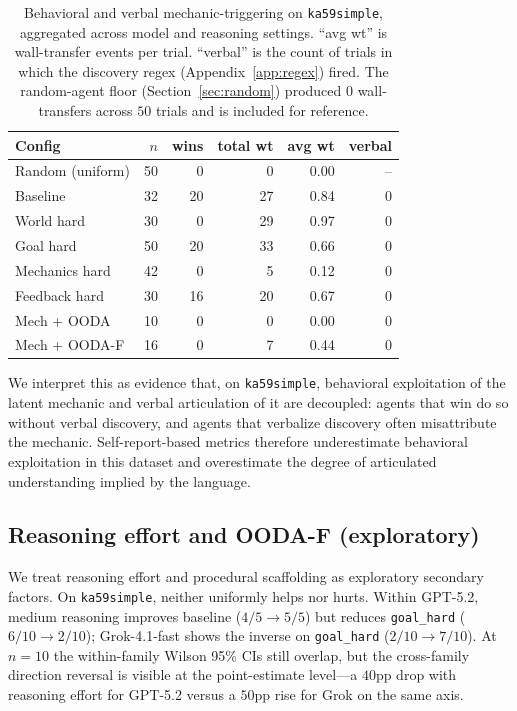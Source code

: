\documentclass{article}
\begin{document}
\begin{table}[t]
  \small
  \setlength{\tabcolsep}{4pt}
  \caption{Behavioral and verbal mechanic-triggering on \texttt{ka59simple}, aggregated across model and reasoning settings. ``avg wt'' is wall-transfer events per trial. ``verbal'' is the count of trials in which the discovery regex (Appendix~\ref{app:regex}) fired. The random-agent floor (Section~\ref{sec:random}) produced $0$ wall-transfers across $50$ trials and is included for reference.}
  \label{tab:mechanic-triggering}
  \centering
  \begin{tabular}{lrrrrr}
    \toprule
    Config & $n$ & wins & total wt & avg wt & verbal \\
    \midrule
    Random (uniform)         & 50 &  0 &  0 & 0.00 & --  \\
    Baseline                 & 32 & 20 & 27 & 0.84 &  0  \\
    World hard               & 30 &  0 & 29 & 0.97 &  0  \\
    Goal hard                & 50 & 20 & 33 & 0.66 &  0  \\
    Mechanics hard           & 42 &  0 &  5 & 0.12 &  0  \\
    Feedback hard            & 30 & 16 & 20 & 0.67 &  0  \\
    Mech + OODA              & 10 &  0 &  0 & 0.00 &  0  \\
    Mech + OODA-F            & 16 &  0 &  7 & 0.44 &  0  \\
    \bottomrule
  \end{tabular}
\end{table}

We interpret this as evidence that, on \texttt{ka59simple}, behavioral exploitation of the latent mechanic and verbal articulation of it are decoupled: agents that win do so without verbal discovery, and agents that verbalize discovery often misattribute the mechanic. Self-report-based metrics therefore underestimate behavioral exploitation in this dataset and overestimate the degree of articulated understanding implied by the language.

\subsection{Reasoning effort and OODA-F (exploratory)}
\label{sec:reasoning}
We treat reasoning effort and procedural scaffolding as exploratory secondary factors. On \texttt{ka59simple}, neither uniformly helps nor hurts. Within GPT-5.2, medium reasoning improves baseline ($4/5 \to 5/5$) but reduces \texttt{goal\_hard} ($6/10 \to 2/10$); Grok-4.1-fast shows the inverse on \texttt{goal\_hard} ($2/10 \to 7/10$). At $n=10$ the within-family Wilson 95\% CIs still overlap, but the cross-family direction reversal is visible at the point-estimate level---a $40$pp drop with reasoning effort for GPT-5.2 versus a $50$pp rise for Grok on the same axis.
\end{document}
